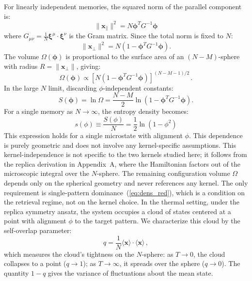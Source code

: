 \documentclass{article}
\theoremstyle{plain}
\theoremstyle{definition}
\theoremstyle{remark}
\begin{document}
For linearly independent memories, the squared norm of the parallel component is:
\begin{equation}
    \|\mathbf{x}_{\parallel}\|^2 = N \bm{\phi}^T G^{-1} \bm{\phi}
\end{equation}
where $G_{\mu\nu} = \frac{1}{N} \bm{\xi}^\mu \cdot \bm{\xi}^\nu$ is the Gram matrix. Since the total norm is fixed to $N$:
\begin{equation}
    \|\mathbf{x}_{\perp}\|^2 = N \left( 1 - \bm{\phi}^T G^{-1} \bm{\phi} \right).
\end{equation}
The volume $\Omega(\bm{\phi})$ is proportional to the surface area of an $(N-M)$-sphere with radius $R = \|\mathbf{x}_{\perp}\|$, giving:
\begin{equation}
    \Omega(\bm{\phi}) \propto \left[ N \left( 1 - \bm{\phi}^T G^{-1} \bm{\phi} \right) \right]^{(N-M-1)/2}\,.
\end{equation}
In the large $N$ limit, discarding $\phi$-independent constants:
\begin{equation}
    S(\bm{\phi}) = \ln \Omega = \frac{N-M}{2} \ln \left( 1 - \bm{\phi}^T G^{-1} \bm{\phi} \right).
\end{equation}
For a single memory as $N \to \infty$, the entropy density becomes:
\begin{equation}
    s(\phi) \equiv \frac{S(\phi)}{N} = \frac{1}{2} \ln ( 1 - \phi^2 )
	\label{eq:entropy_g}
\end{equation}
This expression holds for a single microstate with alignment $\phi$. This dependence is purely geometric and does not involve any kernel-specific assumptions. This kernel-independence is not specific to the two kernels studied here; it follows from the replica derivation in Appendix~A, where the Hamiltonian factors out of the microscopic integral over the $N$-sphere. The remaining configuration volume $\Omega$ depends only on the spherical geometry and never references any kernel. The only requirement is single-pattern dominance~(\ref{eq:dens_red}), which is a condition on the retrieval regime, not on the kernel choice.
In the thermal setting, under the replica symmetry ansatz, the system occupies a cloud of states centered at a point with alignment $\phi$ to the target pattern. We characterize this cloud by the self-overlap parameter:
\begin{equation}
    q = \frac{1}{N} \langle \bm{x} \rangle \cdot \langle \bm{x} \rangle\,,
\end{equation}
which measures the cloud's tightness on the $N$-sphere: as $T \to 0$, the cloud collapses to a point ($q \to 1$); as $T \to \infty$, it spreads over the sphere ($q \to 0$). The quantity $1-q$ gives the variance of fluctuations about the mean state.
\end{document}
